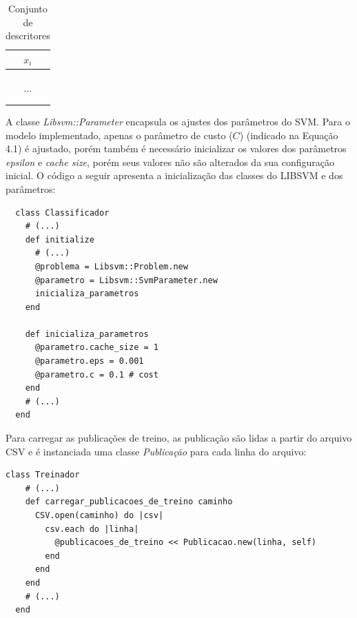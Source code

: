 \begin{table}[ht]
  \caption{Conjunto de descritores}
  \centering
  \begin{tabular}{| c |}
    \hline
    \textbf{${x}_{i}$} \\ [0.5ex] \hline \hline
    [1, 0, 0, 1, 0, 0, ..., 0, 0, 1] \\ \hline
    [0, 0, 0, 1, 1, 0, ..., 0, 1, 0] \\ \hline
    [0, 1, 0, 1, 0, 0, ..., 0, 0, 0] \\ \hline
    ... \\ \hline
    [0, 0, 1, 0, 0, 0, ..., 1, 0, 1] \\ \hline
    [1, 0, 0, 0, 0, 0, ..., 1, 1, 1] \\ \hline
    \hline
  \end{tabular}
  \label{table:nonlin}
\end{table}

A classe \textit{Libsvm::Parameter} encapsula os ajustes dos parâmetros do SVM. Para o modelo implementado, apenas o parâmetro de custo ($C$) (indicado na Equação 4.1) é ajustado, porém também é necessário inicializar os valores dos parâmetros \textit{epsilon} e \textit{cache size}, porém seus valores não são alterados da sua configuração inicial. O código a seguir apresenta a inicialização das classes do LIBSVM e dos parâmetros:

\begin{lstlisting}
  class Classificador
    # (...)
    def initialize
      # (...)
      @problema = Libsvm::Problem.new
      @parametro = Libsvm::SvmParameter.new
      inicializa_parametros
    end

    def inicializa_parametros
      @parametro.cache_size = 1
      @parametro.eps = 0.001
      @parametro.c = 0.1 # cost
    end
    # (...)
  end
\end{lstlisting}

Para carregar as publicações de treino, as publicação são lidas a partir do arquivo CSV e é instanciada uma classe \textit{Publicação} para cada linha do arquivo:

\begin{lstlisting}[caption=Carregamento de publicações]
  class Treinador
    # (...)
    def carregar_publicacoes_de_treino caminho
      CSV.open(caminho) do |csv|
        csv.each do |linha|
          @publicacoes_de_treino << Publicacao.new(linha, self)
        end
      end
    end
    # (...)
  end
\end{lstlisting}

